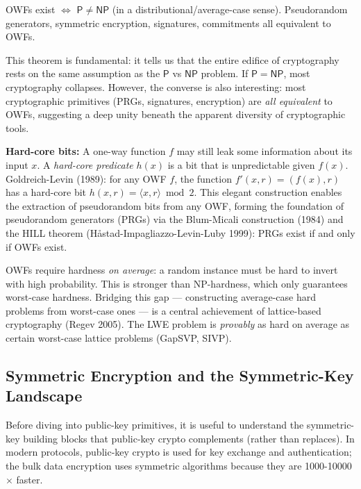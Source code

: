 \begin{theorem}
OWFs exist $\iff$ $\mathsf{P} \neq \mathsf{NP}$ (in a distributional/average-case sense). Pseudorandom generators, symmetric encryption, signatures, commitments all equivalent to OWFs.
\end{theorem}

This theorem is fundamental: it tells us that the entire edifice of cryptography rests on the same assumption as the $\mathsf{P}$ vs $\mathsf{NP}$ problem. If $\mathsf{P} = \mathsf{NP}$, most cryptography collapses. However, the converse is also interesting: most cryptographic primitives (PRGs, signatures, encryption) are \emph{all equivalent} to OWFs, suggesting a deep unity beneath the apparent diversity of cryptographic tools.

\textbf{Hard-core bits:} A one-way function $f$ may still leak some information about its input $x$. A \emph{hard-core predicate} $h(x)$ is a bit that is unpredictable given $f(x)$. Goldreich-Levin (1989): for any OWF $f$, the function $f'(x, r) = (f(x), r)$ has a hard-core bit $h(x, r) = \langle x, r \rangle \bmod 2$. This elegant construction enables the extraction of pseudorandom bits from any OWF, forming the foundation of pseudorandom generators (PRGs) via the Blum-Micali construction (1984) and the HILL theorem (Håstad-Impagliazzo-Levin-Luby 1999): PRGs exist if and only if OWFs exist.

OWFs require hardness \emph{on average}: a random instance must be hard to invert with high probability. This is stronger than NP-hardness, which only guarantees worst-case hardness. Bridging this gap — constructing average-case hard problems from worst-case ones — is a central achievement of lattice-based cryptography (Regev 2005). The LWE problem is \emph{provably} as hard on average as certain worst-case lattice problems (GapSVP, SIVP).

\subsection{Symmetric Encryption and the Symmetric-Key Landscape}
\label{sec:crypto:symmetric}

Before diving into public-key primitives, it is useful to understand the symmetric-key building blocks that public-key crypto complements (rather than replaces). In modern protocols, public-key crypto is used for key exchange and authentication; the bulk data encryption uses symmetric algorithms because they are 1000-10000$\times$ faster.

